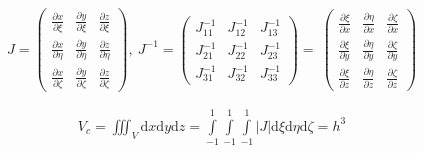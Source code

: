 \documentclass[11pt]{article}
\newcommand{\Vc}{V_c}
\newcommand{\xxi}{\frac{\partial x}{\partial \xi}}
\newcommand{\yxi}{\frac{\partial y}{\partial \xi}}
\newcommand{\zxi}{\frac{\partial z}{\partial \xi}}
\newcommand{\xeta}{\frac{\partial x}{\partial \eta}}
\newcommand{\yeta}{\frac{\partial y}{\partial \eta}}
\newcommand{\zeeta}{\frac{\partial z}{\partial \eta}}
\newcommand{\xzeta}{\frac{\partial x}{\partial \zeta}}
\newcommand{\yzeta}{\frac{\partial y}{\partial \zeta}}
\newcommand{\zzeta}{\frac{\partial z}{\partial \zeta}}
\newcommand{\xix}{\frac{\partial \xi}{\partial x}}
\newcommand{\xiy}{\frac{\partial \xi}{\partial y}}
\newcommand{\xiz}{\frac{\partial \xi}{\partial z}}
\newcommand{\etax}{\frac{\partial \eta}{\partial x}}
\newcommand{\etay}{\frac{\partial \eta}{\partial y}}
\newcommand{\etaz}{\frac{\partial \eta}{\partial z}}
\newcommand{\zetax}{\frac{\partial \zeta}{\partial x}}
\newcommand{\zetay}{\frac{\partial \zeta}{\partial y}}
\newcommand{\zetaz}{\frac{\partial \zeta}{\partial z}}
\newcommand{\md}{\mbox{d}}
\newcommand{\Int}{\int\limits}
\begin{document}
\begin{enumerate}
\begin{equation*}
    J =
    \begin{pmatrix}
    \xxi & \yxi  & \zxi   \\
    \xeta & \yeta & \zeeta   \\
    \xzeta & \yzeta & \zzeta
    \end{pmatrix},\:
    J^{-1} =
    \begin{pmatrix}
    J_{11}^{-1} & J_{12}^{-1}  &  J_{13}^{-1}  \\
    J_{21}^{-1} & J_{22}^{-1} & J_{23}^{-1}   \\
    J_{31}^{-1} & J_{32}^{-1} & J_{33}^{-1}
    \end{pmatrix} =\:
    \begin{pmatrix}
    \xix & \etax  & \zetax   \\
    \xiy & \etay & \zetay   \\
    \xiz & \etaz & \zetaz
    \end{pmatrix}
\end{equation*}

    \begin{align*}
    \Vc = \iiint_V \md x \md y \md z = \Int_{-1}^{1}  \Int_{-1}^{1} \Int_{-1}^{1} |J| \md \xi \md \eta \md \zeta = h^3
    \end{align*}


\end{enumerate}
\end{document}

